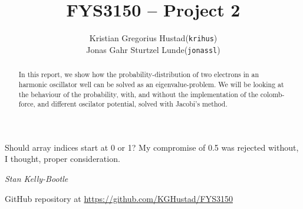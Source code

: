 \documentclass[a4paper]{article}
\begin{document}
\title{FYS3150 -- Project 2}
\author{
    \begin{tabular}{r l}
        Kristian Gregorius Hustad & (\texttt{krihus})\\
        Jonas Gahr Sturtzel Lunde & (\texttt{jonassl})
    \end{tabular}}

\maketitle



\setlength{\epigraphwidth}{0.75\textwidth}
\renewcommand{\epigraphflush}{center}
\renewcommand{\beforeepigraphskip}{50pt}
\renewcommand{\afterepigraphskip}{100pt}
\renewcommand{\epigraphsize}{\normalsize}

\epigraph{Should array indices start at 0 or 1?  My compromise of 0.5 was rejected without, I thought, proper consideration.}
{\textit{Stan Kelly-Bootle}}


\begin{abstract}
\noindent
In this report, we show how the probability-distribution of two electrons in an harmonic oscillator well can be solved as an eigenvalue-problem. We will be looking at the behaviour of the probability, with, and without the implementation of the colomb-force, and different oscilator potential, solved with Jacobi's method.
\end{abstract}

\vfill


\begin{center}
    GitHub repository at \url{https://github.com/KGHustad/FYS3150}
\end{center}

\newpage

\newcommand{\half}{\frac{1}{2}}
\newcommand{\dx}{{\Delta x}}
\newcommand{\bigO}{{\mathcal{O}}}
\end{document}
